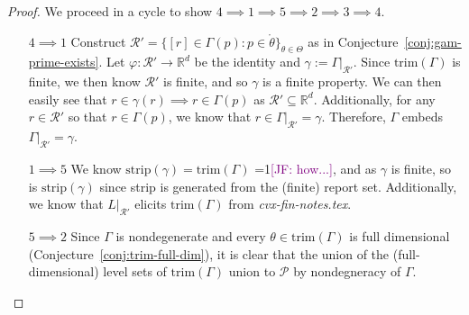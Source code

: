 \documentclass[12pt]{article}
\newcommand{\Comments}{1}
\newcommand{\mynote}[2]{\ifnum\Comments=1\textcolor{#1}{#2}\fi}
\newcommand{\jessie}[1]{\mynote{purple}{[JF: #1]}}
\newcommand{\reals}{\mathbb{R}}
\renewcommand{\P}{\mathcal{P}}
\newcommand{\R}{\mathcal{R}}
\newcommand{\inter}[1]{\mathring{#1}}%
\newcommand{\trim}{\mathrm{trim}}
\newcommand{\strip}{\mathrm{strip}}
\begin{document}
\begin{proof}
We proceed in a cycle to show $4 \implies 1 \implies 5 \implies 2 \implies 3 \implies 4$.

\begin{enumerate}


\item[$4 \implies 1$] 
Construct $\R' = \{ [r] \in \Gamma(p): p \in \inter{\theta} \}_{\theta\in\Theta}$ as in Conjecture~\ref{conj:gam-prime-exists}.
Let $\varphi : \R' \to \reals^d$ be the identity and $\gamma := \Gamma|_{\R'}$.
Since $\trim(\Gamma)$ is finite, we then know $\R'$ is finite, and so $\gamma$ is a finite property.
We can then easily see that $r \in \gamma(r) \implies r \in \Gamma(p)$ as $\R' \subseteq \reals^d$.
Additionally, for any $r \in \R'$ so that $r \in \Gamma(p)$, we know that $r \in \Gamma|_{\R'} = \gamma$.
Therefore, $\Gamma$ embeds $\Gamma|_{\R'} = \gamma$.




\item [$1 \implies 5$]
We know $\strip(\gamma) = \trim(\Gamma)$ \jessie{how...}, and as $\gamma$ is finite, so is $\strip(\gamma)$ since strip is generated from the (finite) report set.
Additionally, we know that $L|_{\R'}$ elicits $\trim(\Gamma)$ from \emph{cvx-fin-notes.tex}.

\item [$5 \implies 2$]
Since $\Gamma$ is nondegenerate and every $\theta \in \trim(\Gamma)$ is full dimensional (Conjecture~\ref{conj:trim-full-dim}), it is clear that the union of the (full-dimensional) level sets of $\trim(\Gamma)$ union to $\P$ by nondegneracy of $\Gamma$.



\end{enumerate}
\end{proof}
\end{document}

